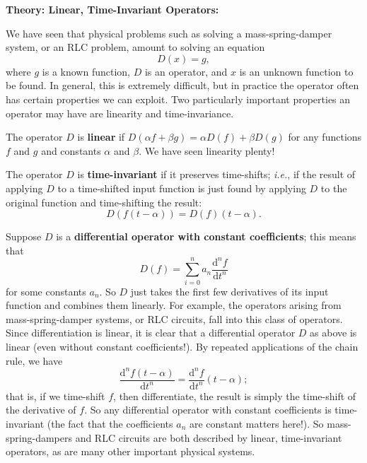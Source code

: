 \documentclass{article}
\newcommand{\deriv}[3][]{\frac{\mathrm{d}^{#1}#2}{\mathrm{d}#3^{#1}}}
\begin{document}
\clearpage












\textbf{Theory: Linear, Time-Invariant Operators:}\bigskip


We have seen that physical problems such as solving a mass-spring-damper system, or an RLC problem, amount to solving an equation
\[D(x)=g,\]
where $g$ is a known function, $D$ is an operator, and $x$ is an unknown function to be found. In general, this is extremely difficult, but in practice the operator often has certain properties we can exploit. Two particularly important properties an operator may have are linearity and time-invariance.\medskip


The operator $D$ is \textbf{linear} if $D(\alpha f+\beta g)=\alpha D(f)+\beta D(g)$ for any functions $f$ and $g$ and constants $\alpha$ and $\beta$. We have seen linearity plenty!\medskip

The operator $D$ is \textbf{time-invariant} if it preserves time-shifts; \textit{i.e.}, if the result of applying $D$ to a time-shifted input function is just found by applying $D$ to the original function and time-shifting the result:
\[D(f(t-\alpha))=D(f)(t-\alpha).\]

\medskip


Suppose $D$ is a \textbf{differential operator with constant coefficients}; this means that
\[D(f)=\sum_{i=0}^n a_n\deriv[n]{f}{t}\]
for some constants $a_n$. So $D$ just takes the first few derivatives of its input function and combines them linearly. For example, the operators arising from mass-spring-damper systems, or RLC circuits, fall into this class of operators. Since differentiation is linear, it is clear that a differential operator $D$ as above is linear (even without constant coefficients!). By repeated applications of the chain rule, we have
\[\deriv[n]{f(t-\alpha)}{t}=\deriv[n]{f}{t}(t-\alpha);\]
that is, if we time-shift $f$, then differentiate, the result is simply the time-shift of the derivative of $f$. So any differential operator with constant coefficients is time-invariant (the fact that the coefficients $a_n$ are constant matters here!). So mass-spring-dampers and RLC circuits are both described by linear, time-invariant operators, as are many other important physical systems.
\end{document}
